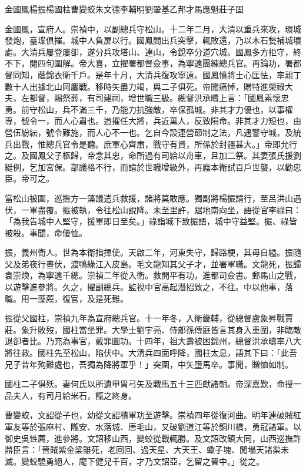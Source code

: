 
\begin{pinyinscope}
金國鳳楊振楊國柱曹變蛟朱文德李輔明劉肇基乙邦才馬應魁莊子固

金國鳳，宣府人。崇禎中，以副總兵守松山。十二年二月，大清以重兵來攻，環城發炮，臺堞俱摧。城中人負扉以行。國鳳間出兵突擊，輒敗還，乃以木石甃補城壞處。大清兵屢登屢卻，遂分兵攻塔山、連山，令銳卒分道穴城。國鳳多方拒守，終不下，閱四旬圍解。帝大喜，立擢署都督僉事，為寧遠團練總兵官。再論功，署都督同知，蔭錦衣衛千戶。是年十月，大清兵復攻寧遠。國鳳憤將士心匡怯，率親丁數十人出據北山岡鏖戰。移時矢盡力竭，與二子俱死。帝聞痛悼，贈特進榮祿大夫，左都督，賜祭葬，有司建祠，增世職三級。總督洪承疇上言：「國鳳素懷忠勇。前守松山，兵不滿三千，乃能力抗強敵，卒保孤城。非其才力優也，以事權專，號令一，而人心肅也。迨擢任大將，兵近萬人，反致隕命。非其才力短也，由營伍紛紜，號令難施，而人心不一也。乞自今設連營節制之法，凡遇警守城，及統兵出戰，惟總兵官令是聽。庶軍心齊肅，戰守有資，所係於封疆甚大。」帝即允行之。及國鳳父子柩歸，帝念其忠，命所過有司給以舟車，且加二祭。其妻張氏援劉綎例，乞加宮保。部議格不行，而請於世職增級外，再廕本衛試百戶世襲，以勸忠臣。帝可之。

當松山被圍，巡撫方一藻議遣兵救援，諸將莫敢應。獨副將楊振請行，至呂洪山遇伏，一軍盡覆。振被執，令往松山說降。未至里許，踞地南向坐，語從官李祿曰：「為我告城中人堅守，援軍即日至矣。」祿詣城下致振語，城中守益堅。振、祿皆被殺。事聞，命優恤。

振，義州衛人。世為本衛指揮使。天啟二年，河東失守，歸路梗，其母自縊。振隨父及弟夜行晝伏，渡鴨綠江入皮島。毛文龍知其父子才，並署軍職。文龍死，振歸袁崇煥，為寧遠千總。崇禎二年從入衛。救開平有功，進都司僉書。郵馬山之戰，以遊擊進參將。久之，擢副總兵。監視中官高起潛招致之，不往。中以他事，落職。用一藻薦，復官，及是死難。

振從父國柱，崇禎九年為宣府總兵官。十一年冬，入衛畿輔，從總督盧象昇戰賈莊。象升敗歿，國柱當坐罪。大學士劉宇亮、侍郎孫傳庭皆言其身入重圍，非臨敵退卻者比。乃充為事官，戴罪圖功。十四年，祖大壽被困錦州，總督洪承疇率八大將往救。國柱先至松山，陷伏中。大清兵四面呼降，國柱太息，語其下曰：「此吾兄子昔年殉難處也，吾獨為降將軍乎！」突圍，中矢墮馬卒。事聞，贈恤如制。

國柱二子俱殀。妻何氏以所遺甲胄弓矢及戰馬五十三匹獻諸朝。帝深嘉歎，命授一品夫人，有司月給米石，餼之終身。

曹變蛟，文詔從子也，幼從文詔積軍功至遊擊。崇禎四年從復河曲。明年連破賊紅軍友等於張麻村、隴安、水落城、唐毛山，又破劉道江等於銅川橋，勇冠諸軍。以御史吳甡薦，進參將。文詔移山西，變蛟從戰輒勝。及文詔改鎮大同，山西巡撫許鼎臣言：「晉賊紫金梁雖死，老回回、過天星、大天王、蠍子塊、闖塌天諸渠未滅。變蛟驍勇絕人，麾下健兒千百，才乃文詔亞，乞留之晉中。」從之。


\end{pinyinscope}
